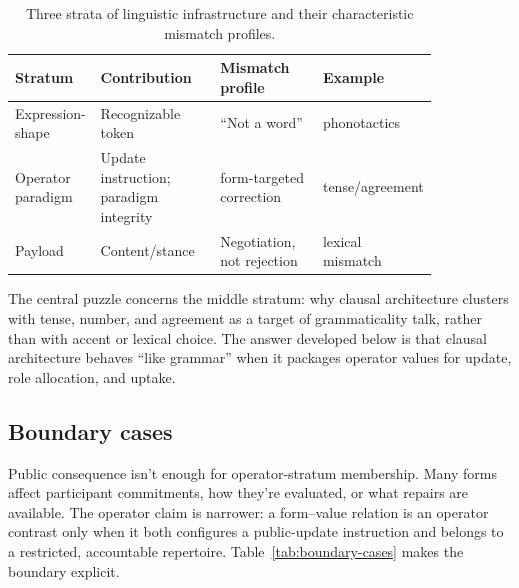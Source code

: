 \documentclass[12pt,letterpaper]{article}
\begin{document}
\begin{table}[ht]
\centering
\scriptsize
\begin{tabular}{@{}p{0.18\linewidth}p{0.29\linewidth}p{0.24\linewidth}p{0.13\linewidth}@{}}
\toprule
\textbf{Stratum} & \textbf{Contribution} & \textbf{Mismatch profile} & \textbf{Example} \\
\midrule
Expression-shape & Recognizable token & \enquote{Not a word} & phonotactics \\
Operator paradigm & Update instruction; paradigm integrity & form-targeted correction & tense/agreement \\
Payload & Content/stance & Negotiation, not rejection & lexical mismatch \\
\bottomrule
\end{tabular}
\caption{Three strata of linguistic infrastructure and their characteristic mismatch profiles.}
\label{tab:strata}
\end{table}

The central puzzle concerns the middle stratum: why clausal architecture clusters with tense, number, and agreement as a target of grammaticality talk, rather than with accent or lexical choice. The answer developed below is that clausal architecture behaves \enquote{like grammar} when it packages operator values for update, role allocation, and uptake.

\subsection{Boundary cases}

Public consequence isn't enough for operator-stratum membership. Many forms affect participant commitments, how they're evaluated, or what repairs are available. The operator claim is narrower: a form--value relation is an operator contrast only when it both configures a public-update instruction and belongs to a restricted, accountable repertoire. Table~\ref{tab:boundary-cases} makes the boundary explicit.
\end{document}
